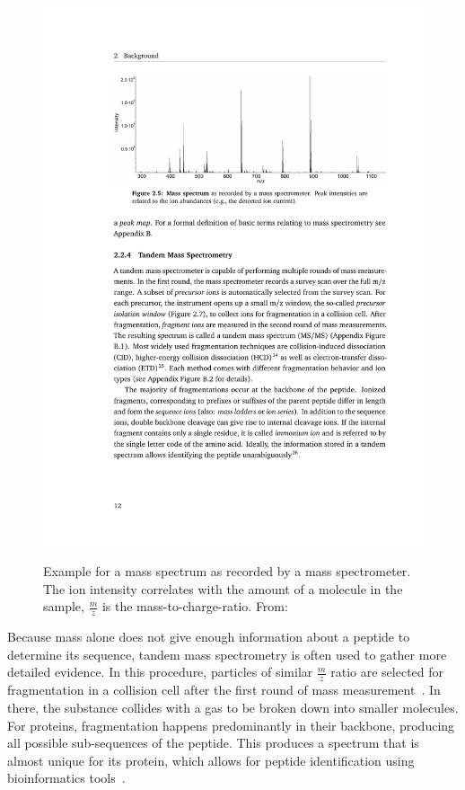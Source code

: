 \documentclass[10pt,a4paper]{article}
\begin{document}
		\begin{figure}
			\centering
			\includegraphics[width = \textwidth, trim=3.9cm 20cm 2.5cm 3cm,			clip]{Grafik_Timo.pdf}
			\label{fig:mass_spectrum}
			\caption{Example for a mass spectrum as recorded by a mass spectrometer. The ion intensity correlates with the amount of a molecule in the sample, $\frac{m}{z}$ is the mass-to-charge-ratio. From:~\citet{Sachsenberg2017}}
		\end{figure}
		Because mass alone does not give enough information about a peptide to determine its sequence, tandem mass spectrometry is often used to gather more detailed evidence. In this procedure, particles of similar $\frac{m}{z}$ ratio are selected for fragmentation in a collision cell after the first round of mass measurement~\cite{Sachsenberg2017}. In there, the substance collides with a gas to be broken down into smaller molecules. For proteins, fragmentation happens predominantly in their backbone, producing all possible sub-sequences of the peptide. This produces a spectrum that is almost unique for its protein, which allows for peptide identification using bioinformatics tools~\cite{Angel2012}.\\
\end{document}
